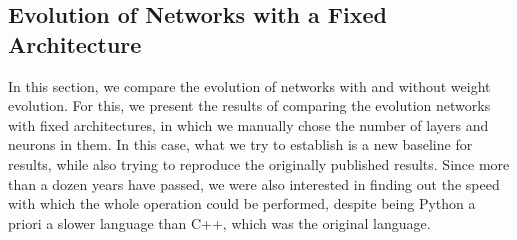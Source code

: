 \documentclass[runningheads]{llncs}
\begin{document}



\subsection{Evolution of Networks with a Fixed Architecture}

In this section, we compare the evolution of networks with and without weight
evolution. For this, we present the results of comparing the evolution networks
with fixed architectures, in which we manually chose the number of layers and
neurons in them. In this case, what we try to establish is a new
baseline for results, while also trying to reproduce the originally
published results. Since more than a dozen years have passed, we were
also interested in finding out the speed with which the whole
operation could be performed, despite being Python a priori a slower
language than C++, which was the original language.
\end{document}

